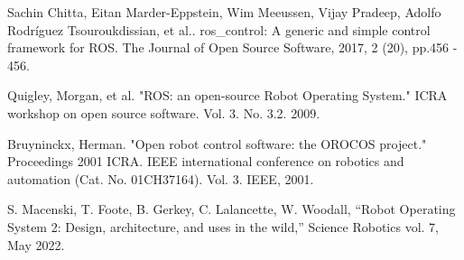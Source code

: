 \documentclass[journal]{IEEEtran}
\begin{document}
%
%
%
%
% 
% 
%
\newpage
\begin{thebibliography}{8}

Sachin Chitta, Eitan Marder-Eppstein, Wim Meeussen, Vijay Pradeep, Adolfo Rodríguez Tsouroukdissian, et al.. ros\_control: A generic and simple control framework for ROS. The Journal of Open Source Software, 2017, 2 (20), pp.456 - 456.

Quigley, Morgan, et al. "ROS: an open-source Robot Operating System." ICRA workshop on open source software. Vol. 3. No. 3.2. 2009.

Bruyninckx, Herman. "Open robot control software: the OROCOS project." Proceedings 2001 ICRA. IEEE international conference on robotics and automation (Cat. No. 01CH37164). Vol. 3. IEEE, 2001.

S. Macenski, T. Foote, B. Gerkey, C. Lalancette, W. Woodall, “Robot Operating System 2: Design, architecture, and uses in the wild,” Science Robotics vol. 7, May 2022.


\end{thebibliography}
\end{document}
